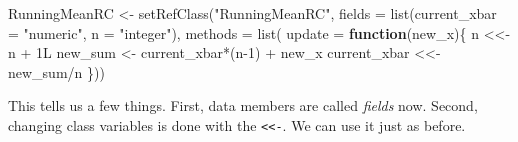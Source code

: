 \documentclass[
  12pt,
  krantz2]{krantz}
\makeatletter
\newenvironment{Shaded}{\begin{snugshade}}{\end{snugshade}}
\newcommand{\AttributeTok}[1]{\textcolor[rgb]{0.61,0.61,0.61}{#1}}
\newcommand{\ControlFlowTok}[1]{\textcolor[rgb]{0.27,0.27,0.27}{\textbf{#1}}}
\newcommand{\DecValTok}[1]{\textcolor[rgb]{0.06,0.06,0.06}{#1}}
\newcommand{\DocumentationTok}[1]{\textcolor[rgb]{0.37,0.37,0.37}{\textbf{\textit{#1}}}}
\newcommand{\FloatTok}[1]{\textcolor[rgb]{0.06,0.06,0.06}{#1}}
\newcommand{\FunctionTok}[1]{\textcolor[rgb]{0,0,0}{#1}}
\newcommand{\NormalTok}[1]{#1}
\newcommand{\OtherTok}[1]{\textcolor[rgb]{0.37,0.37,0.37}{#1}}
\newcommand{\SpecialCharTok}[1]{\textcolor[rgb]{0,0,0}{#1}}
\newcommand{\StringTok}[1]{\textcolor[rgb]{0.5,0.5,0.5}{#1}}
\newenvironment{kframe}{%
\medskip{}
\setlength{\fboxsep}{.8em}
 \def\at@end@of@kframe{}%
 \ifinner\ifhmode%
  \def\at@end@of@kframe{\end{minipage}}%
  \begin{minipage}{\columnwidth}%
 \fi\fi%
 \def\FrameCommand##1{\hskip\@totalleftmargin \hskip-\fboxsep
 \colorbox{shadecolor}{##1}\hskip-\fboxsep
     \hskip-\linewidth \hskip-\@totalleftmargin \hskip\columnwidth}%
 \MakeFramed {\advance\hsize-\width
   \@totalleftmargin\z@ \linewidth\hsize
   \@setminipage}}%
 {\par\unskip\endMakeFramed%
 \at@end@of@kframe}
\renewenvironment{Shaded}{\begin{kframe}}{\end{kframe}}
\makeatother
\begin{document}
\begin{Shaded}
\begin{Highlighting}[]
\NormalTok{RunningMeanRC }\OtherTok{\textless{}{-}} \FunctionTok{setRefClass}\NormalTok{(}\StringTok{"RunningMeanRC"}\NormalTok{, }
                             \AttributeTok{fields =} \FunctionTok{list}\NormalTok{(}\AttributeTok{current\_xbar =} \StringTok{"numeric"}\NormalTok{,}
                                           \AttributeTok{n =} \StringTok{"integer"}\NormalTok{),}
                             \AttributeTok{methods =} \FunctionTok{list}\NormalTok{(}
                               \AttributeTok{update =} \ControlFlowTok{function}\NormalTok{(new\_x)\{}
\NormalTok{                                 n }\OtherTok{\textless{}\textless{}{-}}\NormalTok{ n }\SpecialCharTok{+}\NormalTok{ 1L}
\NormalTok{                                 new\_sum }\OtherTok{\textless{}{-}}\NormalTok{ current\_xbar}\SpecialCharTok{*}\NormalTok{(n}\DecValTok{{-}1}\NormalTok{) }\SpecialCharTok{+}\NormalTok{ new\_x}
\NormalTok{                                 current\_xbar }\OtherTok{\textless{}\textless{}{-}}\NormalTok{ new\_sum}\SpecialCharTok{/}\NormalTok{n}
\NormalTok{                                \}))}
\end{Highlighting}
\end{Shaded}

This tells us a few things. First, data members are called \emph{fields} now. Second, changing class variables is done with the \texttt{\textless{}\textless{}-}. We can use it just as before.

\begin{Shaded}
\end{Shaded}
\end{document}
